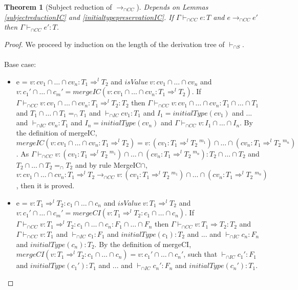 \documentclass[a4paper]{article}
\newtheorem{theorem}{Theorem}
\begin{document}
\begin{theorem}[Subject reduction of $\longrightarrow_{\cap CC}$]
\label{subjectreduction}
Depends on Lemmas \ref{subjectreductionIC} and \ref{initialtypepreservationIC}.
If $\Gamma \vdash_{\cap CC} e : T$ and $e \longrightarrow_{\cap CC} e'$ then $\Gamma \vdash_{\cap CC} e' : T$.
\end{theorem}
\begin{proof}
We proceed by induction on the length of the derivation tree of $\vdash_{\cap S}$.\\\\
Base case:
\begin{itemize}
    \item e = $v : cv_1 \cap \ldots \cap cv_n : T_1 \Rightarrow^l T_2$ and $isValue\ v : cv_1 \cap \ldots \cap cv_n$ and $v : c_1' \cap \ldots \cap c_m' = mergeIC(v : cv_1 \cap \ldots \cap cv_n : T_1 \Rightarrow^l T_2)$.
    If $\Gamma \vdash_{\cap CC} v : cv_1 \cap \ldots \cap cv_n : T_1 \Rightarrow^l T_2 : T_2$ then $\Gamma \vdash_{\cap CC} v : cv_1 \cap \ldots \cap cv_n : T_1 \cap \ldots \cap T_1$ and $T_1 \cap \ldots \cap T_1 =_{\cap} T_1$ and $\vdash_{\cap IC} cv_1 : T_1$ and $I_1 = initialType(cv_1)$ and ... and $\vdash_{\cap IC} cv_n : T_1$ and $I_n = initialType(cv_n)$ and $\Gamma \vdash_{\cap CC} v : I_1 \cap \ldots \cap I_n$.
    By the definition of mergeIC, $mergeIC(v : cv_1 \cap \ldots \cap cv_n : T_1 \Rightarrow^l T_2) = v : (cv_1 : T_1 \Rightarrow^l T_2\ ^{m_1}) \cap \ldots \cap (cv_n : T_1 \Rightarrow^l T_2\ ^{m_n})$.
    As $\Gamma \vdash_{\cap CC} v : (cv_1 : T_1 \Rightarrow^l T_2\ ^{m_1}) \cap \ldots \cap (cv_n : T_1 \Rightarrow^l T_2\ ^{m_n}) : T_2 \cap \ldots \cap T_2$ and $T_2 \cap \ldots \cap T_2 =_{\cap} T_2$ and by rule MergeIC$\cap$, $v : cv_1 \cap \ldots \cap cv_n : T_1 \Rightarrow^l T_2 \longrightarrow_{\cap CC} v : (cv_1 : T_1 \Rightarrow^l T_2\ ^{m_1}) \cap \ldots \cap (cv_n : T_1 \Rightarrow^l T_2\ ^{m_n})$, then it is proved.
    \item e = $v : T_1 \Rightarrow^l T_2 : c_1 \cap \ldots \cap c_n$ and $isValue\ v : T_1 \Rightarrow^l T_2$ and $v : c_1' \cap \ldots \cap c_m' = mergeCI(v : T_1 \Rightarrow^l T_2 : c_1 \cap \ldots \cap c_n)$.
    If $\Gamma \vdash_{\cap CC} v : T_1 \Rightarrow^l T_2 : c_1 \cap \ldots \cap c_n : F_1 \cap \ldots \cap F_n$ then $\Gamma \vdash_{\cap CC} v : T_1 \Rightarrow T_2 : T_2$ and $\Gamma \vdash_{\cap CC} v : T_1$ and $\vdash_{\cap IC} c_1 : F_1$ and $initialType(c_1) : T_2$ and ... and $\vdash_{\cap IC} c_n : F_n$ and $initialType(c_n) : T_2$.
    By the definition of mergeCI, $mergeCI(v : T_1 \Rightarrow^l T_2 : c_1 \cap \ldots \cap c_n) = v : c_1' \cap \ldots \cap c_n'$, such that $\vdash_{\cap IC} c_1' : F_1$ and $initialType(c_1') : T_1$ and ... and $\vdash_{\cap IC} c_n' : F_n$ and $initialType(c_n') : T_1$.

\end{itemize}
\end{proof}
\end{document}
